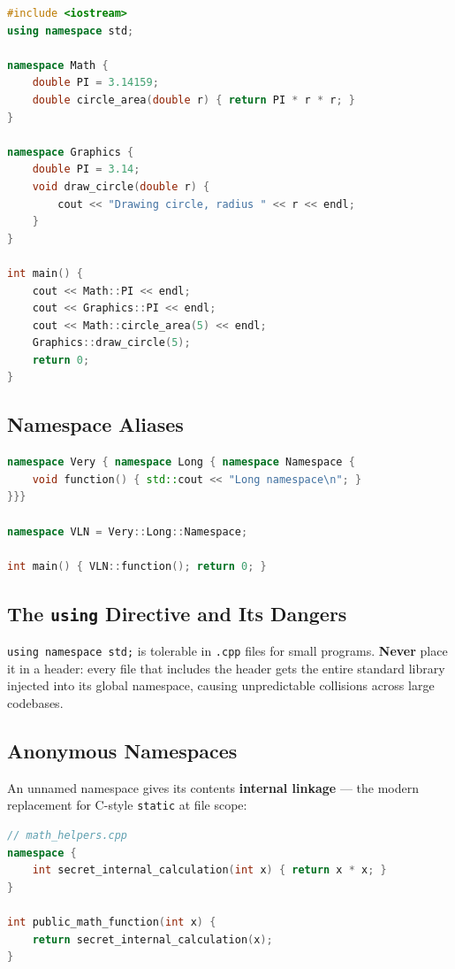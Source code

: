 \begin{lstlisting}[language=C++, caption={Namespace basics}]
#include <iostream>
using namespace std;

namespace Math {
    double PI = 3.14159;
    double circle_area(double r) { return PI * r * r; }
}

namespace Graphics {
    double PI = 3.14;
    void draw_circle(double r) {
        cout << "Drawing circle, radius " << r << endl;
    }
}

int main() {
    cout << Math::PI << endl;
    cout << Graphics::PI << endl;
    cout << Math::circle_area(5) << endl;
    Graphics::draw_circle(5);
    return 0;
}
\end{lstlisting}

\subsection{Namespace Aliases}

\begin{lstlisting}[language=C++, caption={Namespace alias shortening a long path}]
namespace Very { namespace Long { namespace Namespace {
    void function() { std::cout << "Long namespace\n"; }
}}}

namespace VLN = Very::Long::Namespace;

int main() { VLN::function(); return 0; }
\end{lstlisting}

\subsection{The \texttt{using} Directive and Its Dangers}

\texttt{using namespace std;} is tolerable in \texttt{.cpp} files for small programs. \textbf{Never} place it in a header: every file that includes the header gets the entire standard library injected into its global namespace, causing unpredictable collisions across large codebases.

\subsection{Anonymous Namespaces}

An unnamed namespace gives its contents \textbf{internal linkage} --- the modern replacement for C-style \texttt{static} at file scope:

\begin{lstlisting}[language=C++, caption={Anonymous namespace for internal linkage}]
// math_helpers.cpp
namespace {
    int secret_internal_calculation(int x) { return x * x; }
}

int public_math_function(int x) {
    return secret_internal_calculation(x);
}
\end{lstlisting}

